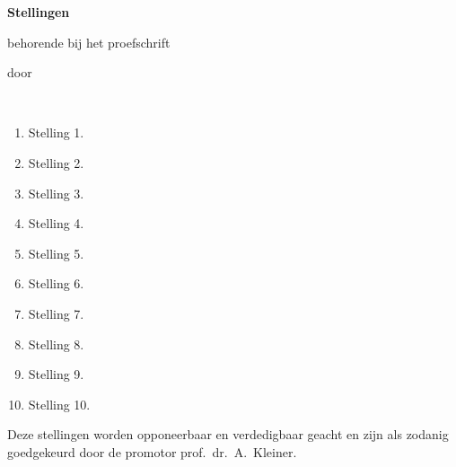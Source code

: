 \documentclass{dissertation}
\begin{document}
\clearpage
{

\begin{center}

{\Large\titlefont\bfseries Stellingen}

\bigskip

behorende bij het proefschrift

\bigskip

{\makeatletter
\titlestyle\bfseries\large\@title
\makeatother}

{\makeatletter
\ifx\@subtitle\undefined\else
    \titlefont\titleshape\@subtitle
\fi
\makeatother}

\bigskip

door

\bigskip

\makeatletter
{\large\titlefont\bfseries\@firstname\ {\titleshape\@lastname}}
\makeatother

\end{center}

\bigskip
\bigskip

\begin{enumerate}

\item Stelling 1.
\item Stelling 2.
\item Stelling 3.
\item Stelling 4.
\item Stelling 5.
\item Stelling 6.
\item Stelling 7.
\item Stelling 8.
\item Stelling 9.
\item Stelling 10.

\end{enumerate}

\bigskip
\bigskip

\begin{center}
Deze stellingen worden opponeerbaar en verdedigbaar geacht en zijn als zodanig goedgekeurd door de promotor prof.\ dr.\ A.\ Kleiner.
\end{center}

}
\end{document}
